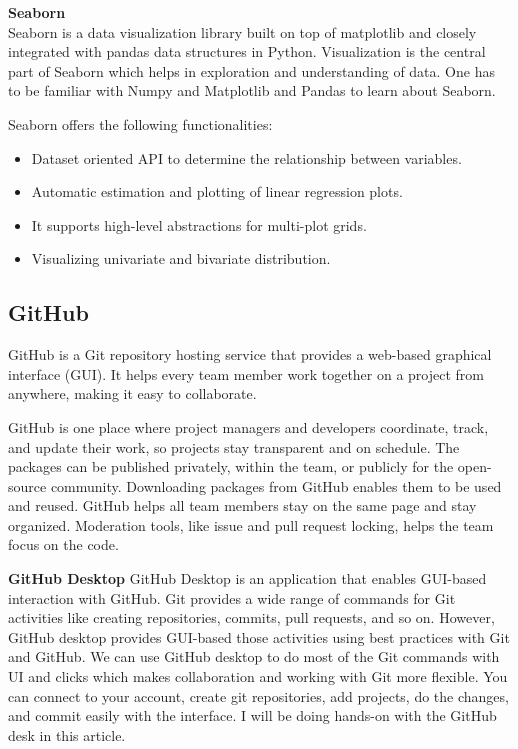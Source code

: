 \documentclass[12pt]{article}
\begin{document}
\textbf{Seaborn}
\\
Seaborn is a data visualization library built on top of matplotlib and closely integrated with pandas data structures in Python. Visualization is the central part of Seaborn which helps in exploration and understanding of data. One has to be familiar with Numpy and Matplotlib and Pandas to learn about Seaborn.

Seaborn offers the following functionalities:
\begin{itemize}
\item Dataset oriented API to determine the relationship between variables.
\item Automatic estimation and plotting of linear regression plots.
\item It supports high-level abstractions for multi-plot grids.
\item Visualizing univariate and bivariate distribution.
\end{itemize}

\newpage
\subsection{GitHub}
GitHub is a Git repository hosting service that provides a web-based graphical interface (GUI). It helps every team member work together on a project from anywhere, making it easy to collaborate. 

GitHub is one place where project managers and developers coordinate, track, and update their work, so projects stay transparent and on schedule. The packages can be published privately, within the team, or publicly for the open-source community. Downloading packages from GitHub enables them to be used and reused. GitHub helps all team members stay on the same page and stay organized. Moderation tools, like issue and pull request locking, helps the team focus on the code.

\textbf{GitHub Desktop}
GitHub Desktop is an application that enables GUI-based interaction with GitHub. Git provides a wide range of commands for Git activities like creating repositories, commits, pull requests, and so on. However, GitHub desktop provides GUI-based those activities using best practices with Git and GitHub. We can use GitHub desktop to do most of the Git commands with UI and clicks which makes collaboration and working with Git more flexible. You can connect to your account, create git repositories, add projects, do the changes, and commit easily with the interface. I will be doing hands-on with the GitHub desk in this article.
\end{document}
